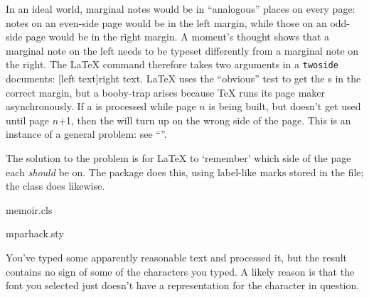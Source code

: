 In an ideal world, marginal notes would be in ``analogous'' places on
every page: notes on an even-side page would be in the left margin,
while those on an odd-side page would be in the right margin.  A
moment's thought shows that a marginal note on the left needs to be
typeset differently from a marginal note on the right.  The \LaTeX{}
 command therefore takes two arguments in a
\texttt{twoside} documents: %
[left text]{right text}.  \LaTeX{} uses the
``obvious'' test to
get the s in the correct margin, but a booby-trap arises
because \TeX{} runs its page maker asynchronously.  If a
 is processed while page \ensuremath{n} is being built, but
doesn't get used until page \ensuremath{n}+1, then the  will turn
up on the wrong side of the page.  This is an instance of a general
problem: see
``''.

The solution to the problem is for \LaTeX{} to `remember' which side
of the page each  \emph{should} be on.  The
 package does this, using label-like marks stored in
the  file; the  class does likewise.
\begin{ctanrefs}
\item[memoir.cls]
\item[mparhack.sty]
\end{ctanrefs}


You've typed some apparently reasonable text and processed it, but the
result contains no sign of some of the characters you typed.  A likely
reason is that the font you selected just doesn't have a
representation for the character in question.

